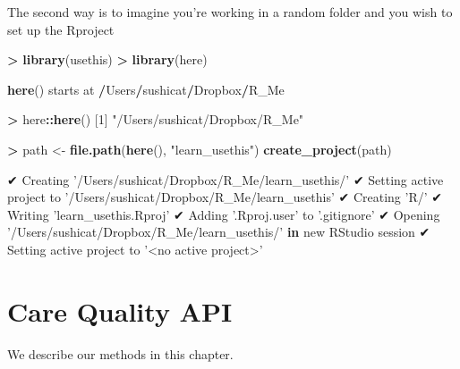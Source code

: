 \documentclass[]{book}
\newenvironment{Shaded}{\begin{snugshade}}{\end{snugshade}}
\newcommand{\ControlFlowTok}[1]{\textcolor[rgb]{0.13,0.29,0.53}{\textbf{#1}}}
\newcommand{\DecValTok}[1]{\textcolor[rgb]{0.00,0.00,0.81}{#1}}
\newcommand{\KeywordTok}[1]{\textcolor[rgb]{0.13,0.29,0.53}{\textbf{#1}}}
\newcommand{\NormalTok}[1]{#1}
\newcommand{\OperatorTok}[1]{\textcolor[rgb]{0.81,0.36,0.00}{\textbf{#1}}}
\newcommand{\StringTok}[1]{\textcolor[rgb]{0.31,0.60,0.02}{#1}}
\begin{document}
The second way is to imagine you're working in a random folder and you wish to set up the Rproject

\begin{Shaded}
\begin{Highlighting}[]
\OperatorTok{>}\StringTok{ }\KeywordTok{library}\NormalTok{(usethis)}
\OperatorTok{>}\StringTok{ }\KeywordTok{library}\NormalTok{(here)}

\KeywordTok{here}\NormalTok{() starts at }\OperatorTok{/}\NormalTok{Users}\OperatorTok{/}\NormalTok{sushicat}\OperatorTok{/}\NormalTok{Dropbox}\OperatorTok{/}\NormalTok{R_Me}
\end{Highlighting}
\end{Shaded}

\begin{Shaded}
\begin{Highlighting}[]
\OperatorTok{>}\StringTok{ }\NormalTok{here}\OperatorTok{::}\KeywordTok{here}\NormalTok{()}
\NormalTok{[}\DecValTok{1}\NormalTok{] }\StringTok{"/Users/sushicat/Dropbox/R_Me"}
\end{Highlighting}
\end{Shaded}

\begin{Shaded}
\begin{Highlighting}[]
\OperatorTok{>}\StringTok{ }\NormalTok{path <-}\StringTok{ }\KeywordTok{file.path}\NormalTok{(}\KeywordTok{here}\NormalTok{(), }\StringTok{"learn_usethis"}\NormalTok{)}
\KeywordTok{create_project}\NormalTok{(path)}

\NormalTok{✔ Creating }\StringTok{'/Users/sushicat/Dropbox/R_Me/learn_usethis/'}
\NormalTok{✔ Setting active project to }\StringTok{'/Users/sushicat/Dropbox/R_Me/learn_usethis'}
\NormalTok{✔ Creating }\StringTok{'R/'}
\NormalTok{✔ Writing }\StringTok{'learn_usethis.Rproj'}
\NormalTok{✔ Adding }\StringTok{'.Rproj.user'}\NormalTok{ to }\StringTok{'.gitignore'}
\NormalTok{✔ Opening }\StringTok{'/Users/sushicat/Dropbox/R_Me/learn_usethis/'} \ControlFlowTok{in}\NormalTok{ new RStudio session}
\NormalTok{✔ Setting active project to }\StringTok{'<no active project>'}
\end{Highlighting}
\end{Shaded}

\hypertarget{care-quality-api}{%
\chapter{Care Quality API}\label{care-quality-api}}

We describe our methods in this chapter.
\end{document}
